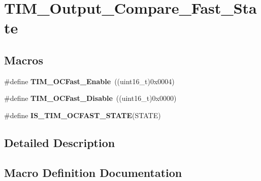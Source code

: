 \hypertarget{group___t_i_m___output___compare___fast___state}{}\section{T\+I\+M\+\_\+\+Output\+\_\+\+Compare\+\_\+\+Fast\+\_\+\+State}
\label{group___t_i_m___output___compare___fast___state}
\subsection*{Macros}
\begin{DoxyCompactItemize}
\item 
\hypertarget{group___t_i_m___output___compare___fast___state_ga0cfb598c985363ee7004e52c97c524a3}{}\#define {\bfseries T\+I\+M\+\_\+\+O\+C\+Fast\+\_\+\+Enable}~((uint16\+\_\+t)0x0004)\label{group___t_i_m___output___compare___fast___state_ga0cfb598c985363ee7004e52c97c524a3}

\item 
\hypertarget{group___t_i_m___output___compare___fast___state_gab3d39f8797953cb58754205169d8278e}{}\#define {\bfseries T\+I\+M\+\_\+\+O\+C\+Fast\+\_\+\+Disable}~((uint16\+\_\+t)0x0000)\label{group___t_i_m___output___compare___fast___state_gab3d39f8797953cb58754205169d8278e}

\item 
\#define {\bfseries I\+S\+\_\+\+T\+I\+M\+\_\+\+O\+C\+F\+A\+S\+T\+\_\+\+S\+T\+A\+T\+E}(S\+T\+A\+T\+E)
\end{DoxyCompactItemize}


\subsection{Detailed Description}


\subsection{Macro Definition Documentation}
\hypertarget{group___t_i_m___output___compare___fast___state_ga65ad85cb4ba48660e8f519a1f6c298d2}{}
